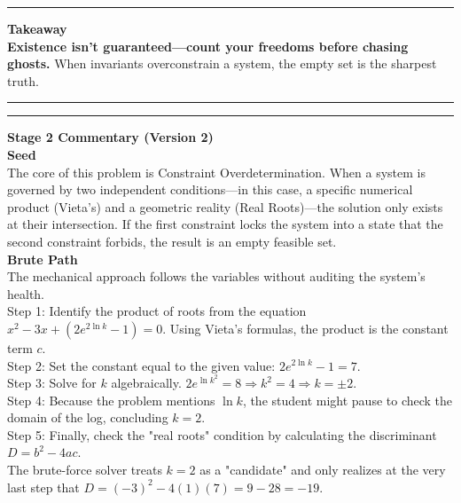 \documentclass{article}
\begin{document}
\noindent \rule{\textwidth}{0.4pt}

\noindent \textbf{Takeaway} \\

\noindent \textbf{Existence isn't guaranteed—count your freedoms before chasing ghosts.} When invariants overconstrain a system, the empty set is the sharpest truth. \\

\noindent \rule{\textwidth}{0.4pt}
\noindent \rule{\textwidth}{0.4pt}

\noindent \textbf{Stage 2 Commentary (Version 2)} \\

\noindent \textbf{Seed} \\

\noindent The core of this problem is Constraint Overdetermination. When a system is governed by two independent conditions—in this case, a specific numerical product (Vieta’s) and a geometric reality (Real Roots)—the solution only exists at their intersection. If the first constraint locks the system into a state that the second constraint forbids, the result is an empty feasible set. \\

\noindent \textbf{Brute Path} \\

\noindent The mechanical approach follows the variables without auditing the system’s health. \\

\noindent Step 1: Identify the product of roots from the equation $x^2 - 3x + (2e^{2 \ln k} - 1) = 0$. Using Vieta’s formulas, the product is the constant term $c$. \\

\noindent Step 2: Set the constant equal to the given value: $2e^{2 \ln k} - 1 = 7$. \\

\noindent Step 3: Solve for $k$ algebraically. $2e^{\ln k^2} = 8 \Rightarrow k^2 = 4 \Rightarrow k = \pm 2$. \\

\noindent Step 4: Because the problem mentions $\ln k$, the student might pause to check the domain of the log, concluding $k = 2$. \\

\noindent Step 5: Finally, check the "real roots" condition by calculating the discriminant $D = b^2 - 4ac$. \\

\noindent The brute-force solver treats $k=2$ as a "candidate" and only realizes at the very last step that $D = (-3)^2 - 4(1)(7) = 9 - 28 = -19$. \\
\end{document}
